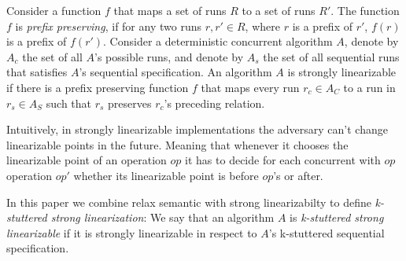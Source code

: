 \begin{definition}

Consider a function $f$ that maps a set of runs $R$ to a set of
runs $R'$. 
The function $f$ is \emph{prefix preserving}, if
for any two runs $r, r' \in R$, where $r$ is a prefix of $r'$,
$f(r)$ is a prefix of $f(r')$.
%
Consider a deterministic concurrent algorithm $A$, denote by
$A_c$ the set of all $A$'s possible runs, and denote by $A_s$ the set of
all sequential runs that satisfies $A$'s sequential
specification. 
An algorithm $A$ is strongly linearizable if there
is a prefix preserving function $f$ that maps every run $r_c
\in A_C$ to a run in $r_s \in A_S$ such that $r_s$ preserves
$r_c$'s preceding relation. 

\end{definition}



 
Intuitively, in strongly linearizable implementations the
adversary can't change linearizable points in the future.
Meaning that whenever it chooses the linearizable point of an
operation $op$ it has to decide for each concurrent with $op$
operation $op'$ whether its linearizable point is before $op$'s
or after.

 
In this paper we combine relax semantic with strong
linearizabilty to define \emph{k-stuttered strong
linearization}:
We say that an algorithm $A$ is \emph{k-stuttered strong
linearizable} if it is strongly linearizable in respect to $A$'s
k-stuttered sequential specification.

